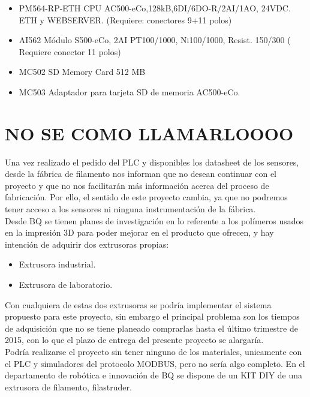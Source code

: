 \begin{itemize}
	\item{PM564-RP-ETH CPU AC500-eCo,128kB,6DI/6DO-R/2AI/1AO, 24VDC. ETH y WEBSERVER. (Requiere: conectores 9+11 polos)}
	\item{AI562 Módulo S500-eCo, 2AI PT100/1000, Ni100/1000, Resist. 150/300 ( Requiere conector 11 polos)}
	\item{MC502 SD Memory Card 512 MB}
	\item{MC503 Adaptador para tarjeta SD de memoria AC500-eCo.}
\end{itemize}

\section{NO SE COMO LLAMARLOOOO}
\label{}

Una vez realizado el pedido del PLC y disponibles los datasheet de los sensores, desde la fábrica de filamento nos informan que no desean continuar con el proyecto y que no nos facilitarán más información acerca del proceso de fabricación. Por ello, el sentido de este proyecto cambia, ya que no podremos tener acceso a los sensores ni ninguna instrumentación de la fábrica.\\

Desde BQ se tienen planes de investigación en lo referente a los polímeros usados en la impresión 3D para poder mejorar en el producto que ofrecen, y hay intención de adquirir dos extrusoras propias:

\begin{itemize}
		\item{Extrusora industrial.}
		\item{Extrusora de laboratorio.}
\end{itemize}

Con cualquiera de estas dos extrusoras se podría implementar el sistema propuesto para este proyecto, sin embargo el principal problema son los tiempos de adquisición que no se tiene planeado comprarlas hasta el último trimestre de 2015, con lo que el plazo de entrega del presente proyecto se alargaría.\\

Podría realizarse el proyecto sin tener ninguno de los materiales, unicamente con el PLC y simuladores del protocolo MODBUS, pero no sería algo completo. En el departamento de robótica e innovación de BQ se dispone de un KIT DIY de una extrusora de filamento, filastruder.\\


